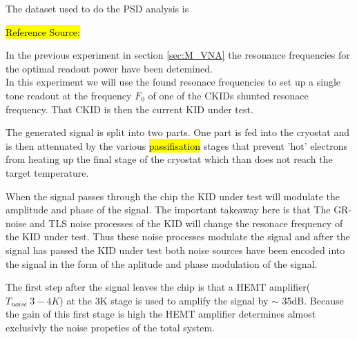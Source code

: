 The dataset used to do the PSD analysis is 


\hl{Reference Source:}

In the previous experiment in section \ref{sec:M_VNA} the resonance frequencies for the optimal readout power have been detemined.\\ 

In this experiment we will use the found resonace frequencies to set up a single tone readout at the frequency $F_0$ of one of the CKIDs shunted resonace frequency. That CKID is then the current KID under test. 

The generated signal is split into two parts. One part is fed into the cryostat and is then attenuated by the various \hl{passifisation} stages that prevent 'hot' electrons from heating up the final stage of the cryostat which than does not reach the target temperature.

When the signal passes through the chip the KID under test will modulate the amplitude and phase of the signal. The important takeaway here is that The GR-noise and TLS noise processes of the KID will change the resonace frequency of the KID under test. Thus these noise processes modulate the signal and after the signal has passed the KID under test both noise sources have been encoded into the signal in the form of the aplitude and phase modulation of the signal.

The first step after the signal leaves the chip is that a HEMT amplifier($T_{noise}~3-4K$\cite[p.83]{devisserVisser2014Quasiparticle2014}) at the 3K stage is used to amplify the signal by $\sim$ 35dB\cite[p.83]{devisserVisser2014Quasiparticle2014}. Because the gain of this first stage is high the HEMT amplifier determines almost exclusivly the noise propeties of the total system.\cite[Eq 8.37]{couchDigitalAnalogCommunication2013}

